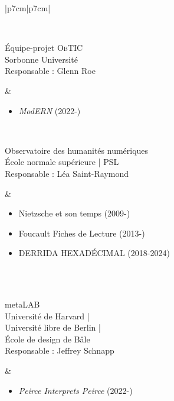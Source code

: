 \begin{table}[htbp]
{\begin{tabular}[t]{|p{7cm}|p{7cm}|}
\begin{minipage}[t]{\linewidth}
\begin{itemize}[leftmargin=*]
				\end{itemize}
			\end{minipage} \\ \hline
						\begin{minipage}[t]{\linewidth}
				Équipe-projet \textsc{ObTIC}\\
				Sorbonne Université\\
				Responsable : Glenn Roe
			\end{minipage}
			&
			\begin{minipage}[t]{\linewidth}
				\begin{itemize}[leftmargin=*]
					\item \textit{Mod\textsc{ERN}} (2022-)
					
				\end{itemize}
			\end{minipage} \\ \hline
			\begin{minipage}[t]{\linewidth}
				Observatoire des humanités numériques\\
				École normale supérieure | \textsc{PSL}\\
				Responsable : Léa  Saint-Raymond
			\end{minipage} 
			& 
			\begin{minipage}[t]{\linewidth}
				\begin{itemize}[leftmargin=*]
					\item \og{}Nietzsche et son temps\fg{} (2009-)
					\item \og{}Foucault Fiches de Lecture \fg{} (2013-)
					\item \og{}DERRIDA HEXADÉCIMAL\fg{} (2018-2024)
				\end{itemize}
			\end{minipage} \\ \hline\hline
								\\ \hline
						\begin{minipage}[t]{\linewidth}
				meta\textsc{LAB}\\
				Université de Harvard |\\ Université libre de Berlin |\\ École de design de Bâle\\
				Responsable : Jeffrey Schnapp
			\end{minipage} 
			& 
			\begin{minipage}[t]{\linewidth}
				\begin{itemize}[leftmargin=*]
					\item \textit{Peirce Interprets Peirce} (2022-)

\end{itemize}
\end{minipage}
\end{tabular}}
\end{table}
